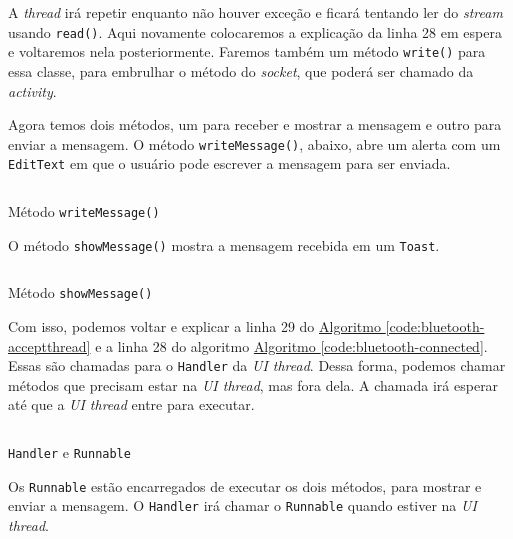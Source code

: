 \documentclass[a4paper,12pt,brazil,oneside]{book}
\begin{document}
	A \emph{thread} irá repetir enquanto não houver exceção e ficará tentando ler do \emph{stream} usando \texttt{read()}. Aqui novamente colocaremos a explicação da linha 28 em espera e voltaremos nela posteriormente. Faremos também um método \texttt{write()} para essa classe, para embrulhar o método do \emph{socket}, que poderá ser chamado da \emph{activity}.

	Agora temos dois métodos, um para receber e mostrar a mensagem e outro para enviar a mensagem. O método \texttt{writeMessage()}, abaixo, abre um alerta com um \texttt{EditText} em que o usuário pode escrever a mensagem para ser enviada.

	\begin{listing}[H]
	\inputminted[linenos=true,fontsize=\small,frame=lines, framesep=2mm, tabsize=2,numbersep=5pt]{java}{src/api/bluetooth/writemessage.java}
	\caption{Método \texttt{writeMessage()}}
	\label{code:bluetooth-writemessage}
	\end{listing} 	
	 
	O método \texttt{showMessage()} mostra a mensagem recebida em um \texttt{Toast}.

	\begin{listing}[H]
	\inputminted[linenos=true,fontsize=\small,frame=lines, framesep=2mm, tabsize=2,numbersep=5pt]{java}{src/api/bluetooth/showmessage.java}
	\caption{Método \texttt{showMessage()}}
	\label{code:bluetooth-showmessage}
	\end{listing} 	

	Com isso, podemos voltar e explicar a linha 29 do \hyperref[code:bluetooth-acceptthread]{Algoritmo \ref*{code:bluetooth-acceptthread}} e a linha 28 do algoritmo \hyperref[code:bluetooth-connected]{Algoritmo \ref*{code:bluetooth-connected}}. Essas são chamadas para o \texttt{Handler} da \emph{UI thread}. Dessa forma, podemos chamar métodos que precisam estar na \emph{UI thread}, mas fora dela. A chamada irá esperar até que a \emph{UI thread} entre para executar.

	\begin{listing}[H]
	\inputminted[linenos=true,fontsize=\small,frame=lines, framesep=2mm, tabsize=2,numbersep=5pt]{java}{src/api/bluetooth/handler.java}
	\caption{\texttt{Handler} e \texttt{Runnable}}
	\label{code:bluetooth-handler}
	\end{listing} 	

	Os \texttt{Runnable} estão encarregados de executar os dois métodos, para mostrar e enviar a mensagem. O \texttt{Handler} irá chamar o \texttt{Runnable} quando estiver na \emph{UI thread}.
\end{document}
